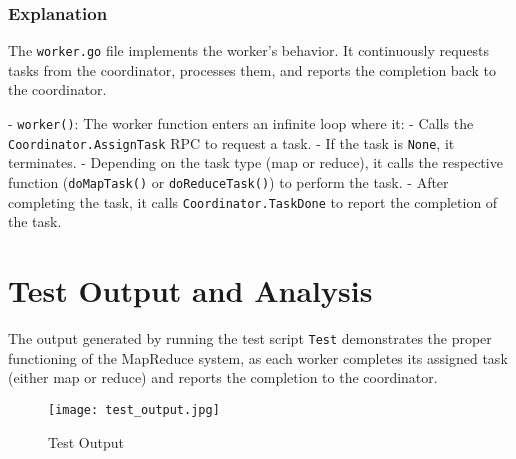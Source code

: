 \documentclass[a4paper,12pt]{article}
\begin{document}
\subsubsection{Explanation}
The \texttt{worker.go} file implements the worker's behavior. It continuously requests tasks from the coordinator, processes them, and reports the completion back to the coordinator.

- \texttt{worker()}: The worker function enters an infinite loop where it:
  - Calls the \texttt{Coordinator.AssignTask} RPC to request a task.
  - If the task is \texttt{None}, it terminates.
  - Depending on the task type (map or reduce), it calls the respective function (\texttt{doMapTask()} or \texttt{doReduceTask()}) to perform the task.
  - After completing the task, it calls \texttt{Coordinator.TaskDone} to report the completion of the task.

\section{Test Output and Analysis}
The output generated by running the test script \texttt{Test} demonstrates the proper functioning of the MapReduce system, as each worker completes its assigned task (either map or reduce) and reports the completion to the coordinator.

\begin{figure}[h]
    \centering
    \texttt{[image: test\_output.jpg]}
    \caption{Test Output}
    \label{fig:test_output}
\end{figure}
\end{document}
